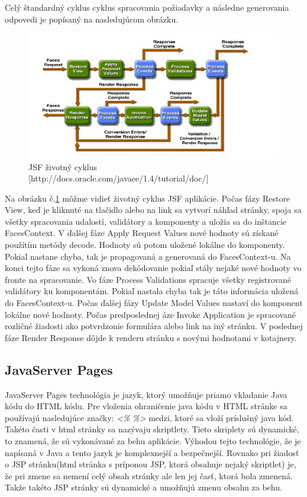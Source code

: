 Celý štandardný cyklus cyklus spracovania požiadavky a následne generovania odpovedi je popísaný na nasledujúcom obrázku.
\begin{figure}[htb]

\begin{center}

\includegraphics[scale=0.7]{jsflifecycle.jpg} 
\caption{JSF životný cyklus [http://docs.oracle.com/javaee/1.4/tutorial/doc/] }
\label{lifecycle}

\end{center}

\end{figure}
Na obrázku č.\ref{lifecycle} môžme vidieť životný cyklus JSF aplikácie. Počas fázy Restore View, keď je kliknuté na tlačidlo alebo na link sa vytvorí náhľad stránky, spoja sa všetky spracovania udalostí, validátory a komponenty a uložia sa do inštancie FacesContext. V ďalšej fáze Apply Request Values nové hodnoty sú získané použítím metódy decode. Hodnoty sú potom uložené lokálne do komponenty. Pokiaľ nastane chyba, tak je propagovaná a generovaná do FacesContext-u. Na konci tejto fáze sa vykoná znova dekódovanie pokiaľ stály nejaké nové hodnoty vo fronte na spracovanie. Vo fáze Process Validations spracuje všetky registrované validátory ku komponentám. Pokiaľ nastala chyba tak je táto informácia uložená do FacesContext-u. Počas ďalšej fázy Update Model Values nastaví do komponent lokálne nové hodnoty. Počas predposlednej áze Invoke Application je spracované rozličné žiadosti ako potvrdzonie formulára alebo link na iný stránku. V poslednej fáze Render Response dôjde k renderu stránku s novými hodnotami v kotajnery.
\subsection{JavaServer Pages}
	JavaServer Pages technológia je jazyk, ktorý umožňuje priamo vkladanie Java kódu do HTML kódu. Pre vloženia ohraničenie java kódu v HTML stránke sa používajú nasledujúce značky: \emph{<\%} \emph{\%>} medzi, ktoré sa vloží príslušný java kód. Takéto časti v html stránky sa nazývaju skriptlety. Tieto skriplety sú dynamické, to znamená, že sú vykonávané za behu aplikácie. Výhodou tejto technológie, že je napísaná v Java a tento jazyk je komplexnejší a bezpečnejší. Rovnako pri žiadosť o JSP stránku(html stránka s príponou JSP, ktorá obsahuje nejaký skriptlet) je, že pri zmene sa nemení celý obsah stránky ale len jej časť, ktorá bola zmenená. Takže takéto JSP stránky sú dynamické a umožňujú zmenu obsahu za behu.

